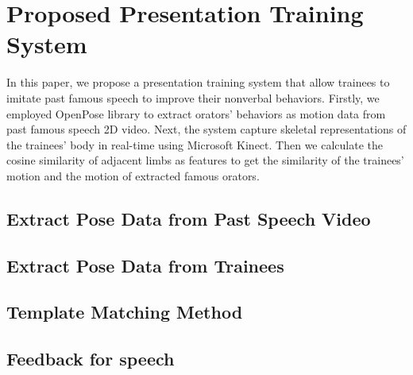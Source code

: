 \chapter{Proposed Presentation Training System}
\par In this paper, we propose a presentation training system that allow trainees to imitate past famous speech to improve their nonverbal behaviors. Firstly, we employed OpenPose library \cite{cao2017realtime} to extract orators' behaviors as motion data from past famous speech 2D video. Next, the system capture skeletal representations of the trainees' body in real-time using Microsoft Kinect. Then we calculate the cosine similarity of adjacent limbs as features to get the similarity of the trainees' motion and the motion of extracted famous orators.
\section{Extract Pose Data from Past Speech Video}
\section{Extract Pose Data from Trainees}
\section{Template Matching Method}
\section{Feedback for speech}
